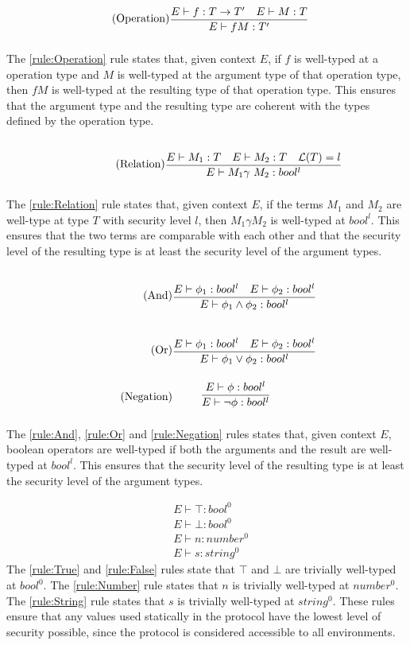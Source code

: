 \begin{align*}
\tag{Operation}\label{rule:Operation} &\infrule{E\vdash f:T\ra T'\quad E\vdash M:T}{E\vdash fM:T'}
\end{align*}
The \ref{rule:Operation} rule states that, given context $E$, if $f$ is well-typed at a operation type and $M$ is well-typed at the argument type of that operation type, then $fM$ is well-typed at the resulting type of that operation type.
This ensures that the argument type and the resulting type are coherent with the types defined by the operation type.

\begin{align*}
\tag{Relation}\label{rule:Relation} &\infrule{E\vdash M_1:T\quad E\vdash M_2:T\quad\level{T}=l}{E\vdash M_1 \gamma\ M_2:bool^{l}}
\end{align*}
The \ref{rule:Relation} rule states that, given context $E$, if the terms $M_1$ and $M_2$ are well-type at type $T$ with security level $l$, then $M_1\gamma M_2$ is well-typed at $bool^l$. This ensures that the two terms are comparable with each other and that the security level of the resulting type is at least the security level of the argument types.

\begin{align*}
    \tag{And}\label{rule:And} &\infrule{E\vdash \phi_1:bool^l\quad E\vdash \phi_2:bool^l}{E\vdash \phi _1 \land \phi _2:bool^{l}}\\
    \tag{Or}\label{rule:Or} &\infrule{E\vdash \phi_1:bool^l\quad E\vdash \phi_2:bool^l}{E\vdash \phi _1 \lor \phi _2:bool^{l}}\\
    \tag{Negation}\label{rule:Negation} &\infrule{E\vdash \phi :bool^l }{E\vdash \neg \phi :bool^l}
\end{align*}

The \ref{rule:And}, \ref{rule:Or} and \ref{rule:Negation} rules states that, given context $E$, boolean operators are well-typed if both the arguments and the result are well-typed at $bool^l$. This ensures that the security level of the resulting type is at least the security level of the argument types.

\begin{align*}
\tag{True}\label{rule:True} &E\vdash\top:bool^0\\
\tag{False}\label{rule:False} &E\vdash\bot:bool^0\\
\tag{Number}\label{rule:Number} &E\vdash n:{number^0}\\
\tag{String}\label{rule:String} &E\vdash s:{string^0}
\end{align*}
The \ref{rule:True} and \ref{rule:False} rules state that $\top$ and $\bot$ are trivially well-typed at $bool^0$.
The \ref{rule:Number} rule states that $n$ is trivially well-typed at $number^0$.
The \ref{rule:String} rule states that $s$ is trivially well-typed at $string^0$.
These rules ensure that any values used statically in the protocol have the lowest level of security possible, since the protocol is considered accessible to all environments.

